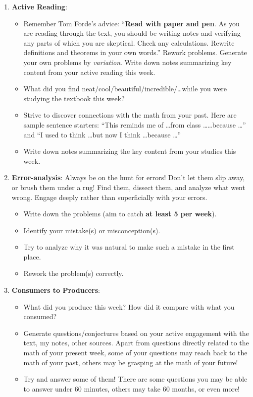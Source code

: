 \documentclass[10pt]{article}
\begin{document}
\begin{enumerate}

\item {\large {\bf Active Reading}}:  
\begin{itemize}
\item Remember Tom Forde's advice: ``{\bf Read with paper and pen}. As you are reading through the text, you should be writing notes and verifying any parts of which you are skeptical. Check any calculations. Rewrite definitions and theorems in your own words.'' Rework problems. Generate your own problems by {\it variation}. Write down notes summarizing key content from your active reading this week.

\item What did you find neat/cool/beautiful/incredible/\dots while you were studying the textbook this week?

\item Strive to discover connections with the math from your past. Here are sample sentence starters: ``This reminds me of \dots from class \dots \dots because \dots''  and ``I used to think \dots but now I think \dots because \dots''

\item Write down notes summarizing the key content from your studies this week.	
	
\end{itemize}

\item {\large {\bf Error-analysis}}:
Always be on the hunt for errors! Don't let them slip away, or brush them under a rug!
Find them, dissect them, and analyze what went wrong. Engage deeply rather than superficially with your errors.
		\begin{itemize}
			\item Write down the problems (aim to catch {\bf at least 5 per week}).							\item Identify your mistake(s) or misconception(s). 
			\item Try to analyze why it was natural to make such a mistake in the first place.
			\item Rework the problem(s) correctly.		
		\end{itemize}

\item {\large {\bf Consumers to Producers}}:  

\begin{itemize}
\item What did you produce this week? How did it compare with what you consumed? 
\item Generate questions/conjectures based on your active engagement with the text, my notes, other sources. Apart from questions directly related to the math of your present week, some of your questions may reach back to the math of your past, others may be grasping at the math of your future!
\item Try and answer some of them! 	There are some questions you may be able to answer under 60 minutes, others may take 60 months, or even more!
\end{itemize}


\end{enumerate}
\end{document}
